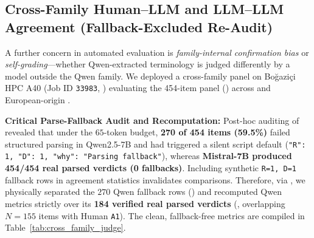 \documentclass[a4paper,12pt]{report}
\begin{document}
\subsection{Cross-Family Human--LLM and LLM--LLM Agreement (Fallback-Excluded Re-Audit)}
\label{sec:cross_family_judge}

A further concern in automated evaluation is \textit{family-internal confirmation bias} or \textit{self-grading}---whether Qwen-extracted terminology is judged differently by a model outside the Qwen family. We deployed a cross-family panel on Bo\u{g}azi\c{c}i HPC A40 (Job ID \texttt{33983}, ) evaluating the 454-item panel () across  and European-origin .

\textbf{Critical Parse-Fallback Audit and Recomputation:} Post-hoc auditing of  revealed that under the $65$-token budget, \textbf{270 of 454 items (59.5\%)} failed structured parsing in Qwen2.5-7B and had triggered a silent script default (\texttt{{"R": 1, "D": 1, "why": "Parsing fallback"}}), whereas \textbf{Mistral-7B produced 454/454 real parsed verdicts (0 fallbacks)}. Including synthetic \texttt{R=1, D=1} fallback rows in agreement statistics invalidates comparisons. Therefore, via , we physically separated the $270$ Qwen fallback rows () and recomputed Qwen metrics strictly over its \textbf{184 verified real parsed verdicts} (, overlapping $N=155$ items with Human \texttt{A1}). The clean, fallback-free metrics are compiled in Table~\ref{tab:cross_family_judge}.
\end{document}
